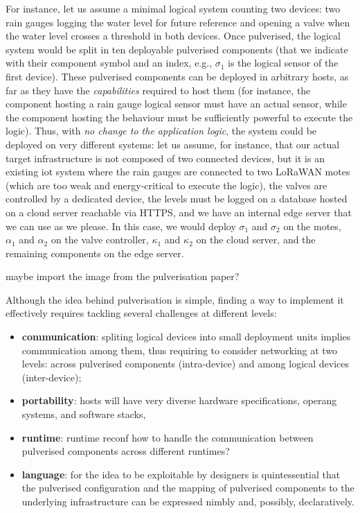 \documentclass[conference]{IEEEtran}
\newcommand{\meta}[1]{{\color{blue}#1}}
\begin{document}
For instance, let us assume a minimal logical system counting two devices:
two rain gauges logging the water level for future reference
and opening a valve when the water level crosses a threshold in both devices.
%
Once pulverised, the logical system would be split in ten deployable pulverised components
(that we indicate with their component symbol and an index, e.g., $\sigma_1$ is the logical sensor of the first device).
%
These pulverised components can be deployed in arbitrary hosts,
as far as they have the \emph{capabilities} required to host them
(for instance, the component hosting a rain gauge logical sensor must have an actual sensor,
while the component hosting the behaviour must be sufficiently powerful to execute the logic).
%
Thus, with \emph{no change to the application logic},
the system could be deployed on very different systems:
let us assume, for instance,
that our actual target infrastructure is not composed of two connected devices,
but it is an existing \ac{iot} system
where the rain gauges are connected to two LoRaWAN motes
(which are too weak and energy-critical to execute the logic),
the valves are controlled by a dedicated device,
the levels must be logged on a database hosted on a cloud server reachable via HTTPS,
and we have an internal edge server that we can use as we please.
%
In this case, we would deploy $\sigma_1$ and $\sigma_2$ on the motes,
$\alpha_1$ and $\alpha_2$ on the valve controller,
$\kappa_1$ and $\kappa_2$ on the cloud server,
and the remaining components on the edge server.

\meta{maybe import the image from the pulverisation paper?}

Although the idea behind pulverisation is simple,
finding a way to implement it effectively requires tackling several challenges at different levels:
\begin{itemize}
    \item \textbf{communication}: spliting logical devices into small deployment units implies communication among them,
    thus requiring to consider networking at two levels:
    across pulverised components (intra-device) and among logical devices (inter-device);
    \item \textbf{portability}: hosts will have very diverse hardware specifications, operang systems, and software stacks,
    \item \textbf{runtime}: runtime reconf how to handle the communication between pulverised components across different runtimes?
    \item \textbf{language}: for the idea to be exploitable by designers is quintessential that
    the pulverised configuration
    and the mapping of pulverised components to the underlying infrastructure
    can be expressed nimbly and, possibly, declaratively.
\end{itemize}
\end{document}
